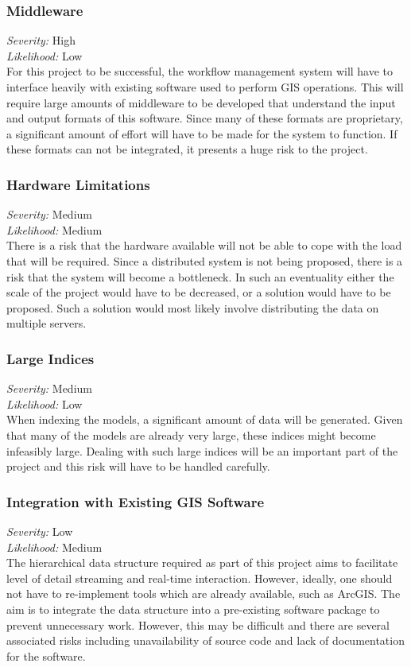 \documentclass[12pt,a4paper]{article}
\begin{document}
\subsubsection*{Middleware}
\noindent \textit{Severity: } High \\
\noindent \textit{Likelihood: } Low \\
For this project to be successful, the workflow management system will have to interface
heavily with existing software used to perform GIS operations. This will
require large amounts of middleware to be developed that understand
the input and output formats of this software. Since many of these
formats are proprietary, a significant amount of effort will have to
be made for the system to function. If these formats can not be integrated,
it presents a huge risk to the project.
\subsubsection*{Hardware Limitations}
\noindent \textit{Severity: } Medium \\
\noindent \textit{Likelihood: } Medium \\
There is a risk that the hardware available will not be able to cope
with the load that will be required. Since a distributed system is
not being proposed, there is a risk that the system will become a bottleneck. In
such an eventuality either the scale of the project would have to be decreased, or
a solution would have to be proposed. Such a solution would most likely involve
distributing the data on multiple servers.
\subsubsection*{Large Indices}
\noindent \textit{Severity: } Medium \\
\noindent \textit{Likelihood: } Low \\
When indexing the models, a significant amount of data will be generated.
Given that many of the models are already very large, these indices might
become infeasibly large. Dealing with such large indices will be an important
part of the project and this risk will have to be handled carefully.
\subsubsection*{Integration with Existing GIS Software}
\noindent \textit{Severity: } Low \\
\noindent \textit{Likelihood: } Medium \\
The hierarchical data structure required as part of this project aims to facilitate level
of detail streaming and real-time interaction. However, ideally, one should not have to
re-implement tools which are already available, such as ArcGIS. The aim is to integrate
the data structure into a pre-existing software package to prevent unnecessary work.
However, this may be difficult and there are several associated risks including
unavailability of source code and lack of documentation for the software.
\end{document}
